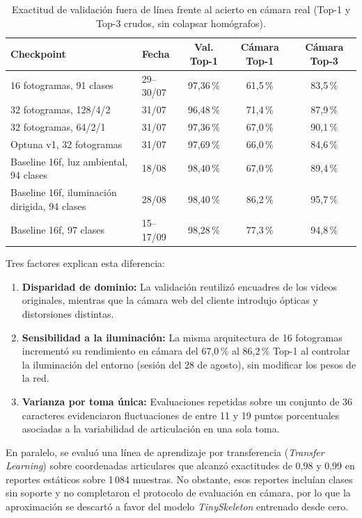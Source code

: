 \begin{table}[H]
    \centering
    \small
    \caption{Exactitud de validación fuera de línea frente al acierto en cámara real (Top-1 y Top-3 crudos, sin colapsar homógrafos).}
    \label{tab:brecha_offline_camara}
    \begin{tabular}{llccc}
        \toprule
        \textbf{Checkpoint} & \textbf{Fecha} & \textbf{Val. Top-1} & \textbf{Cámara Top-1} & \textbf{Cámara Top-3} \\
        \midrule
        16 fotogramas, 91 clases & 29--30/07 & 97{,}36\,\% & 61{,}5\,\% & 83{,}5\,\% \\
        32 fotogramas, 128/4/2 & 31/07 & 96{,}48\,\% & 71{,}4\,\% & 87{,}9\,\% \\
        32 fotogramas, 64/2/1 & 31/07 & 97{,}36\,\% & 67{,}0\,\% & 90{,}1\,\% \\
        Optuna v1, 32 fotogramas & 31/07 & 97{,}69\,\% & 66{,}0\,\% & 84{,}6\,\% \\
        Baseline 16f, luz ambiental, 94 clases & 18/08 & 98{,}40\,\% & 67{,}0\,\% & 89{,}4\,\% \\
        Baseline 16f, iluminación dirigida, 94 clases & 28/08 & 98{,}40\,\% & 86{,}2\,\% & 95{,}7\,\% \\
        Baseline 16f, 97 clases & 15--17/09 & 98{,}28\,\% & 77{,}3\,\% & 94{,}8\,\% \\
        \bottomrule
    \end{tabular}
\end{table}

Tres factores explican esta diferencia:
\begin{enumerate}
    \item \textbf{Disparidad de dominio:} La validación reutilizó encuadres de los videos originales, mientras que la cámara web del cliente introdujo ópticas y distorsiones distintas.
    \item \textbf{Sensibilidad a la iluminación:} La misma arquitectura de 16 fotogramas incrementó su rendimiento en cámara del 67{,}0\,\% al 86{,}2\,\% Top-1 al controlar la iluminación del entorno (sesión del 28 de agosto), sin modificar los pesos de la red.
    \item \textbf{Varianza por toma única:} Evaluaciones repetidas sobre un conjunto de 36 caracteres evidenciaron fluctuaciones de entre 11 y 19 puntos porcentuales asociadas a la variabilidad de articulación en una sola toma.
\end{enumerate}

En paralelo, se evaluó una línea de aprendizaje por transferencia (\textit{Transfer Learning}) sobre coordenadas articulares que alcanzó exactitudes de 0,98 y 0,99 en reportes estáticos sobre 1\,084 muestras. No obstante, esos reportes incluían clases sin soporte y no completaron el protocolo de evaluación en cámara, por lo que la aproximación se descartó a favor del modelo \textit{TinySkeleton} entrenado desde cero.

